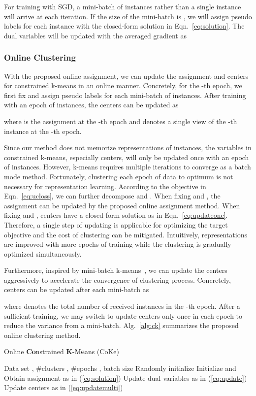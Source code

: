\documentclass[10pt,twocolumn,letterpaper]{article}
\begin{document}
For training with SGD, a mini-batch of instances rather than a single instance will arrive at each iteration. If the size of the mini-batch is , we will assign pseudo labels for each instance with the closed-form solution in Eqn.~\ref{eq:solution}. The dual variables will be updated with the averaged gradient as


\subsubsection{Online Clustering}
With the proposed online assignment, we can update the assignment and centers for constrained k-means in an online manner. Concretely, for the -th epoch, we first fix  and assign pseudo labels for each mini-batch of instances. After training with an epoch of instances, the centers can be updated as

where  is the assignment at the -th epoch and  denotes a single view of the -th instance at the -th epoch.

Since our method does not memorize representations of instances, the variables in constrained k-means, especially centers, will only be updated once with an epoch of instances. However, k-means requires multiple iterations to converge as a batch mode method. Fortunately, clustering each epoch of data to optimum is not necessary for representation learning. According to the objective in Eqn.~\ref{eq:ucloss}, we can further decompose  and . When fixing  and , the assignment can be updated by the proposed online assignment method. When fixing  and , centers have a closed-form solution as in Eqn.~\ref{eq:updateone}. Therefore, a single step of updating is applicable for optimizing the target objective and the cost of clustering can be mitigated. Intuitively, representations are improved with more epochs of training while the clustering is gradually optimized simultaneously.

Furthermore, inspired by mini-batch k-means~\cite{Sculley10}, we can update the centers aggressively to accelerate the convergence of clustering process. Concretely, centers can be updated after each mini-batch as

where  denotes the total number of received instances in the -th epoch. After a sufficient training, we may switch to update centers only once in each epoch to reduce the variance from a mini-batch. Alg.~\ref{alg:ck} summarizes the proposed online clustering method.

\begin{algorithm}[t]
   \caption{Online \textbf{Co}nstrained \textbf{K}-M\textbf{e}ans (CoKe)}
   \label{alg:ck}
\begin{algorithmic}
    Data set , \#clusters , \#epochs , batch size 
   \STATE Randomly initialize 
   \STATE Initialize  and 
   \STATE Obtain assignment  as in (\ref{eq:solution})
   \STATE Update dual variables  as in (\ref{eq:update})
   \STATE Update centers  as in (\ref{eq:updatemulti})
   \STATE 
   \ENDFOR
   \ENDFOR
   \RETURN 
\end{algorithmic}
\end{algorithm}
\end{document}
